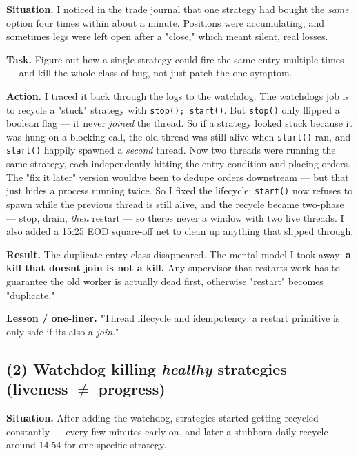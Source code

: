 \documentclass[11pt]{article}
\begin{document}
\textbf{Situation.} I noticed in the trade journal that one strategy had bought the \emph{same} option
four times within about a minute. Positions were accumulating, and sometimes legs were left
open after a "close," which meant silent, real losses.

\textbf{Task.} Figure out how a single strategy could fire the same entry multiple times --- and kill
the whole class of bug, not just patch the one symptom.

\textbf{Action.} I traced it back through the logs to the watchdog. The watchdog\textquotesingle s job is to recycle
a "stuck" strategy with \texttt{stop();\ start()}. But \texttt{stop()} only flipped a boolean flag --- it never
\emph{joined} the thread. So if a strategy looked stuck because it was hung on a blocking call, the
old thread was still alive when \texttt{start()} ran, and \texttt{start()} happily spawned a \emph{second} thread.
Now two threads were running the same strategy, each independently hitting the entry condition
and placing orders. The "fix it later" version would\textquotesingle ve been to dedupe orders downstream --- but
that just hides a process running twice. So I fixed the lifecycle: \texttt{start()} now refuses to
spawn while the previous thread is still alive, and the recycle became two-phase --- stop, drain,
\emph{then} restart --- so there\textquotesingle s never a window with two live threads. I also added a 15:25 EOD
square-off net to clean up anything that slipped through.

\textbf{Result.} The duplicate-entry class disappeared. The mental model I took away: \textbf{a kill that
doesn\textquotesingle t join is not a kill.} Any supervisor that restarts work has to guarantee the old worker
is actually dead first, otherwise "restart" becomes "duplicate."

\textbf{Lesson / one-liner.} "Thread lifecycle and idempotency: a restart primitive is only safe if
it\textquotesingle s also a \emph{join}."

\subsection{\texorpdfstring{(2) Watchdog killing \emph{healthy} strategies (liveness \(\neq\) progress)}{(2) Watchdog killing healthy strategies (liveness \textbackslash neq progress)}}\label{2-watchdog-killing-healthy-strategies-liveness-neq-progress}

\textbf{Situation.} After adding the watchdog, strategies started getting recycled constantly --- every
few minutes early on, and later a stubborn daily recycle around 14:54 for one specific strategy.
\end{document}
